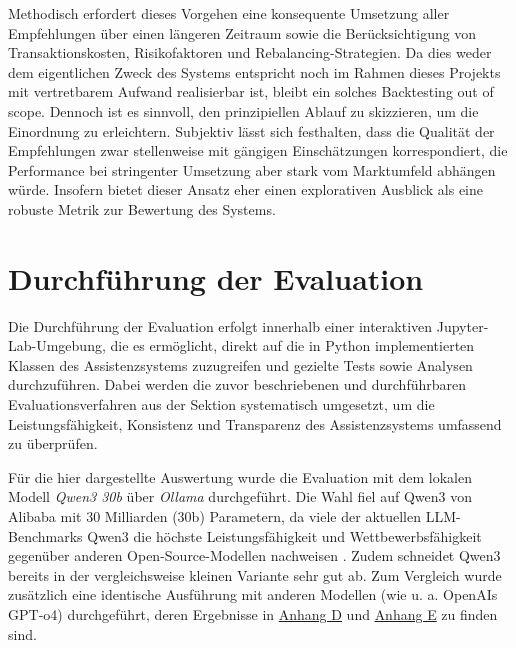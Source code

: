       Methodisch erfordert dieses Vorgehen eine konsequente Umsetzung aller Empfehlungen über einen längeren Zeitraum sowie die Berücksichtigung von Transaktionskosten, Risikofaktoren und Rebalancing-Strategien.
      Da dies weder dem eigentlichen Zweck des Systems entspricht noch im Rahmen dieses Projekts mit vertretbarem Aufwand realisierbar ist, bleibt ein solches Backtesting out of scope.
      Dennoch ist es sinnvoll, den prinzipiellen Ablauf zu skizzieren, um die Einordnung zu erleichtern.
      Subjektiv lässt sich festhalten, dass die Qualität der Empfehlungen zwar stellenweise mit gängigen Einschätzungen korrespondiert, die Performance bei stringenter Umsetzung aber stark vom Marktumfeld abhängen würde.
      Insofern bietet dieser Ansatz eher einen explorativen Ausblick als eine robuste Metrik zur Bewertung des Systems.



  \section{Durchführung der Evaluation}


    Die Durchführung der Evaluation erfolgt innerhalb einer interaktiven Jupyter-Lab-Umgebung, die es ermöglicht, direkt auf die in Python implementierten Klassen des Assistenzsystems zuzugreifen und gezielte Tests sowie Analysen durchzuführen.
    Dabei werden die zuvor beschriebenen und durchführbaren Evaluationsverfahren aus der Sektion \textbf{} systematisch umgesetzt, um die Leistungsfähigkeit, Konsistenz und Transparenz des Assistenzsystems umfassend zu überprüfen.

    Für die hier dargestellte Auswertung wurde die Evaluation mit dem lokalen Modell \emph{Qwen3 30b} über \emph{Ollama} durchgeführt.
    Die Wahl fiel auf Qwen3 von Alibaba mit 30 Milliarden (30b) Parametern, da viele der aktuellen \acs{LLM}-Benchmarks Qwen3 die höchste Leistungsfähigkeit und Wettbewerbsfähigkeit gegenüber anderen Open-Source-Modellen nachweisen \autocite{artificialanalysis2025}.
    Zudem schneidet Qwen3 bereits in der vergleichsweise kleinen Variante sehr gut ab. %
    Zum Vergleich wurde zusätzlich eine identische Ausführung mit anderen Modellen (wie u. a. OpenAIs GPT-o4) durchgeführt, deren Ergebnisse in \hyperref[sec:versuchsaufbau_konsistenz_alternativ]{Anhang D} und \hyperref[sec:versuchsaufbau_konsens_alternativ]{Anhang E} zu finden sind.

